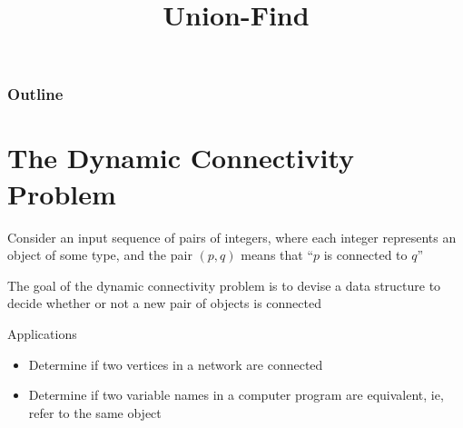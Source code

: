 \documentclass[8pt,a4paper,compress]{beamer}
\title{Union-Find}
\date{}
\begin{document}
\begin{frame}
\vfill
\titlepage
\end{frame}

\begin{frame}
\frametitle{Outline}
\tableofcontents
\end{frame}

\section{The Dynamic Connectivity Problem}
\begin{frame}[fragile]
\begin{minipage}{250pt}
Consider an input sequence of pairs of integers, where each integer represents an object of some type, and the pair $(p, q)$ means that ``$p$ is connected to $q$''

\bigskip

The goal of the dynamic connectivity problem is to devise a data structure to decide whether or not a new pair of objects is connected 

\bigskip

Applications
\begin{itemize}
\item Determine if two vertices in a network are connected

\item Determine if two variable names in a computer program are equivalent, ie, refer to the same object


\end{itemize}
\end{minipage}
\end{frame}
\end{document}
